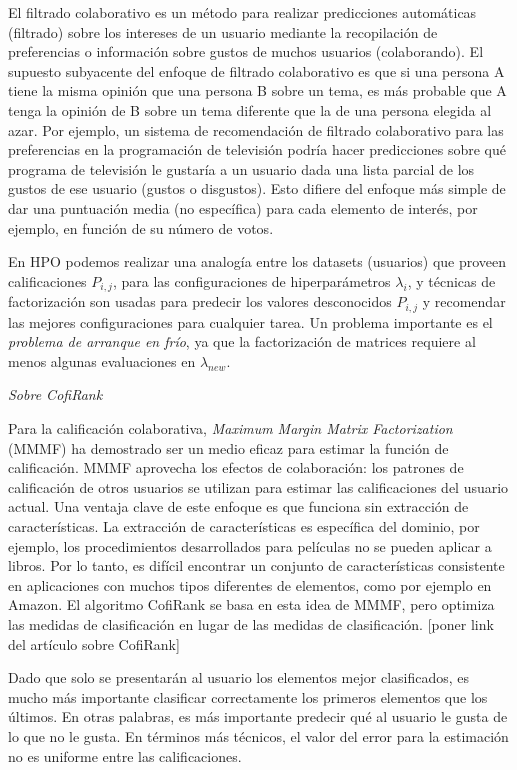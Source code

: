 El filtrado colaborativo es un método para realizar predicciones automáticas (filtrado) sobre los intereses de un usuario mediante la recopilación de preferencias o información sobre gustos de muchos usuarios (colaborando). El supuesto subyacente del enfoque de filtrado colaborativo es que si una persona A tiene la misma opinión que una persona B sobre un tema, es más probable que A tenga la opinión de B sobre un tema diferente que la de una persona elegida al azar. Por ejemplo, un sistema de recomendación de filtrado colaborativo para las preferencias en la programación de televisión podría hacer predicciones sobre qué programa de televisión le gustaría a un usuario dada una lista parcial de los gustos de ese usuario (gustos o disgustos). Esto difiere del enfoque más simple de dar una puntuación media (no específica) para cada elemento de interés, por ejemplo, en función de su número de votos.

En HPO podemos realizar una analogía entre los datasets (usuarios) que proveen calificaciones $P_{i,j}$, para las configuraciones de hiperparámetros $\lambda_i$, y técnicas de factorización son usadas para predecir los valores desconocidos $P_{i,j}$ y recomendar las mejores configuraciones para cualquier tarea. Un problema importante es el \textit{problema de arranque en frío}, ya que la factorización de matrices requiere al menos algunas evaluaciones en $\lambda_{new}$.

\textit{Sobre CofiRank}

Para la calificación colaborativa, \textit{Maximum Margin Matrix Factorization} (MMMF) ha demostrado ser un medio eficaz para estimar la función de calificación. MMMF aprovecha los efectos de colaboración: los patrones de calificación de otros usuarios se utilizan para estimar las calificaciones del usuario actual. Una ventaja clave de este enfoque es que funciona sin extracción de características. La extracción de características es específica del dominio, por ejemplo, los procedimientos desarrollados para películas no se pueden aplicar a libros. Por lo tanto, es difícil encontrar un conjunto de características consistente en aplicaciones con muchos tipos diferentes de elementos, como por ejemplo en Amazon. El algoritmo CofiRank se basa en esta idea de MMMF, pero optimiza las medidas de clasificación en lugar de las medidas de clasificación. [poner link del artículo sobre CofiRank]

Dado que solo se presentarán al usuario los elementos mejor clasificados, es mucho más importante clasificar correctamente los primeros elementos que los últimos. En otras palabras, es más importante predecir qué al usuario le gusta de lo que no le gusta. En términos más técnicos, el valor del error para la estimación no es uniforme entre las calificaciones.

